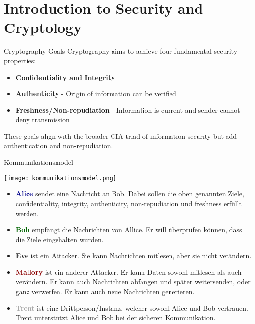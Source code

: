 \section{Introduction to Security and Cryptology}

\begin{concept}{Cryptography Goals}
    Cryptography aims to achieve four fundamental security properties:
    \begin{itemize}
        \item \textbf{Confidentiality and Integrity}
        \item \textbf{Authenticity} - Origin of information can be verified
        \item \textbf{Freshness/Non-repudiation} - Information is current and sender cannot deny transmission
    \end{itemize}
    These goals align with the broader CIA triad of information security but add authentication and non-repudiation.
\end{concept}


\begin{definition}{Kommunikationsmodel}

    \begin{minipage}{0.4\linewidth}
    \texttt{[image: kommunikationsmodel.png]}
    \end{minipage}
    \begin{minipage}{0.6\linewidth}
    \begin{itemize}
        \item \textcolor{darkblue}{\textbf{Alice}} sendet eine Nachricht an Bob. Dabei sollen die oben genannten Ziele, confidentiality, integrity, authenticity, non-repudiation und freshness erfüllt werden.
        \item \textcolor{darkgreen}{\textbf{Bob}} empfängt die Nachrichten von Allice. Er will überprüfen können, dass die Ziele eingehalten wurden.
        \item \textcolor{darktangerine}{\textbf{Eve}}  ist ein Attacker. Sie kann Nachrichten mitlesen, aber sie nicht verändern.
        \item \textcolor{darkred}{\textbf{Mallory}} ist ein anderer Attacker. Er kann Daten sowohl mitlesen als auch verändern. Er kann auch Nachrichten abfangen und später weitersenden, oder ganz verwerfen. Er kann auch neue Nachrichten generieren.
        \item \textcolor{darkgrey}{\textbf{Trent}} ist eine Drittperson/Instanz, welcher sowohl Alice und Bob vertrauen. Trent unterstützt Alice und Bob bei der sicheren Kommunikation.
    \end{itemize}
    \end{minipage}
\end{definition}




